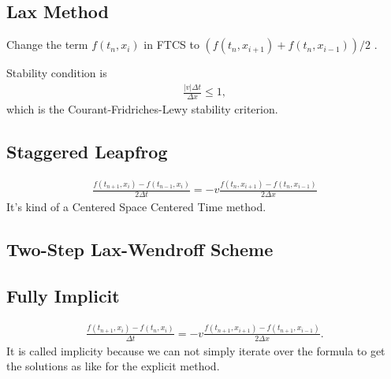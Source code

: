 \documentclass[letterpaper,12pt,english]{sphinxmanual}
\begin{document}
\subsection{Lax Method}
\label{\detokenize{finite-difference/pde/index:lax-method}}
Change the term \(f(t_n, x_i)\) in FTCS to \(( f(t_n, x_{i+1}) + f(t_n, x_{i-1}) )/2\)  \label{\detokenize{finite-difference/pde/index:id2}}{\hyperref[\detokenize{finite-difference/pde/index:numericalrecipes}]{\sphinxcrossref{{[}NumericalRecipes{]}}}}.

Stability condition is
\begin{equation*}
\begin{split}\frac{ \lvert v \rvert \Delta t }{ \Delta x } \leq 1,\end{split}
\end{equation*}
which is the Courant-Fridriches-Lewy stability criterion.


\subsection{Staggered Leapfrog}
\label{\detokenize{finite-difference/pde/index:staggered-leapfrog}}\begin{equation*}
\begin{split}\frac{f(t_{n+1}, x_i) - f(t_{n-1}, x_i)}{2 \Delta t} = -v \frac{ f(t_n, x_{i+1} ) - f(t_n, x_{i-1} ) }{ 2\Delta x}\end{split}
\end{equation*}
It's kind of a Centered Space Centered Time method.


\subsection{Two-Step Lax-Wendroff Scheme}
\label{\detokenize{finite-difference/pde/index:two-step-lax-wendroff-scheme}}

\subsection{Fully Implicit}
\label{\detokenize{finite-difference/pde/index:fully-implicit}}\begin{equation*}
\begin{split}\frac{ f( t_{n+1} , x_i ) - f( t_{n} , x_i ) }{ \Delta t } = - v \frac{ f(t_{n+1}, x_{i+1}) - f(t_{n+1}, x_{i-1}) }{ 2\Delta x }.\end{split}
\end{equation*}
It is called implicity because we can not simply iterate over the formula to get the solutions as like for the explicit method.
\end{document}

